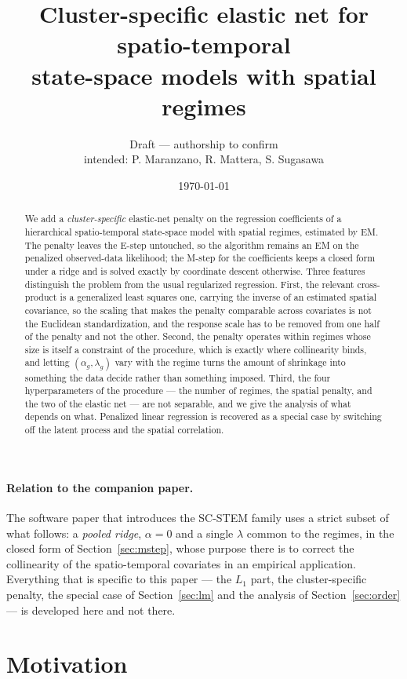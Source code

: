 \documentclass[11pt,a4paper]{article}
\title{Cluster-specific elastic net for spatio-temporal\\
       state-space models with spatial regimes}
\author{Draft --- authorship to confirm\\[2pt]
        \small intended: P. Maranzano, R. Mattera, S. Sugasawa}
\date{\today}
\begin{document}
\maketitle

\begin{abstract}
We add a \emph{cluster-specific} elastic-net penalty on the regression
coefficients of a hierarchical spatio-temporal state-space model with spatial
regimes, estimated by EM. The penalty leaves the E-step untouched, so the
algorithm remains an EM on the penalized observed-data likelihood; the M-step
for the coefficients keeps a closed form under a ridge and is solved exactly by
coordinate descent otherwise. Three features distinguish the problem from the
usual regularized regression. First, the relevant cross-product is a
generalized least squares one, carrying the inverse of an estimated spatial
covariance, so the scaling that makes the penalty comparable across covariates
is not the Euclidean standardization, and the response scale has to be removed
from one half of the penalty and not the other. Second, the penalty operates
within regimes whose size is itself a constraint of the procedure, which is
exactly where collinearity binds, and letting $(\alpha_g,\lambda_g)$ vary with
the regime turns the amount of shrinkage into something the data decide rather
than something imposed. Third, the four hyperparameters of the procedure ---
the number of regimes, the spatial penalty, and the two of the elastic net ---
are not separable, and we give the analysis of what depends on what. Penalized
linear regression is recovered as a special case by switching off the latent
process and the spatial correlation.
\end{abstract}

\paragraph{Relation to the companion paper.} The software paper that introduces
the SC-STEM family uses a strict subset of what follows: a \emph{pooled ridge},
$\alpha = 0$ and a single $\lambda$ common to the regimes, in the closed form
of Section~\ref{sec:mstep}, whose purpose there is to correct the collinearity
of the spatio-temporal covariates in an empirical application. Everything that
is specific to this paper --- the $L_1$ part, the cluster-specific penalty, the
special case of Section~\ref{sec:lm} and the analysis of
Section~\ref{sec:order} --- is developed here and not there.

\section{Motivation}
\end{document}
